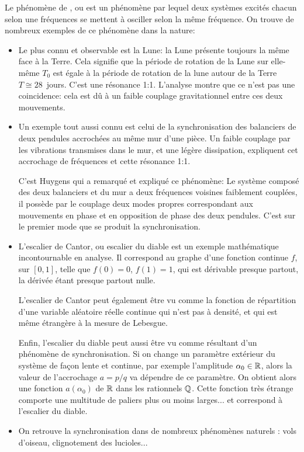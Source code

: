 \medskip
Le phénomène de , ou
 est un phénomène par lequel deux systèmes excités
chacun selon une fréquences se mettent à osciller selon la même fréquence. On trouve de nombreux
exemples de ce phénomène dans la nature:
\begin{itemize}
   \item Le plus connu et observable est la Lune: la Lune présente toujours la même face à la Terre.
	Cela signifie que la période de rotation de la Lune sur elle-même $T_0$ est égale à la
	période de rotation de la lune autour de la Terre $T\cong 28$~jours. C'est une
	résonance 1:1. L'analyse montre que ce n'est pas une coincidence: cela
	est dû à un faible couplage gravitationnel entre ces deux mouvements.

   \item Un exemple tout aussi connu est celui de la synchronisation des balanciers de deux pendules accrochées
	au même mur d'une pièce. Un faible couplage par les vibrations transmises dans le mur,
	et une légère dissipation, expliquent cet accrochage de fréquences et cette résonance 1:1.

	C'est Huygens qui a
	remarqué et expliqué ce phénomène:
	Le système composé des deux balanciers et du mur a deux fréquences voisines faiblement
	couplées, il possède par le couplage deux modes propres correspondant aux mouvements en
	phase et en opposition de phase des deux pendules. C'est sur le premier mode
	que se produit la synchronisation.

   \item L'escalier de Cantor,
	ou escalier du diable est un exemple mathématique incontournable en analyse.
	Il correspond au graphe d'une fonction continue $f$, sur $[0,1]$, telle que $f(0)=0$, $f(1)=1$,
	qui est dérivable presque partout, la dérivée étant presque partout nulle.

	L'escalier de Cantor peut également être vu comme la fonction de répartition d'une variable
	aléatoire réelle continue qui n'est pas à densité, et qui est même étrangère à la
	mesure de Lebesgue.

	Enfin, l'escalier du diable peut aussi être vu comme résultant d'un phénomène de
	synchronisation.
	Si on change un paramètre extérieur du système de façon lente et continue, par
	exemple l'amplitude $\alpha_0\in\mathbb R$, alors la valeur de l'accrochage $a=p/q$ va dépendre de
	ce paramètre. On obtient alors une fonction $a(\alpha_0)$ de $\mathbb R$ dans les rationnels $\mathbb Q$.
	Cette fonction très étrange comporte une multitude de paliers plus ou moins larges... et correspond
	à l'escalier du diable.
	
   \item On retrouve la synchronisation dans de nombreux phénomènes naturels : vols d'oiseau,
	clignotement des lucioles...
\end{itemize}
